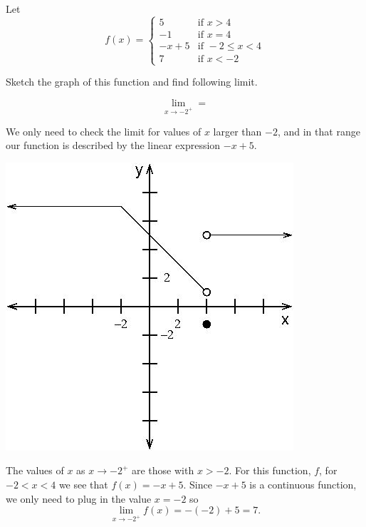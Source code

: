 \documentclass{ximera}
\author{Emma Smith Zbarsky}
\begin{document}
\begin{exercise}

Let
\[f(x) = \begin{cases} 5 & \mbox{if } x>4 \\ -1 & \mbox{if } x=4 \\ -x+5 & \mbox{if } -2\leq x < 4 \\ 7 & \mbox{if } x<-2 \end{cases}\]

Sketch the graph of this function and find following limit.

\[\lim_{x \to -2^+} = \]


\begin{hint}
We only need to check the limit for values of $x$ larger than $-2$, and
in that range our function is described by the linear expression $-x+5$.
\end{hint}


\begin{hint}
\begin{image}\includegraphics[width=.5\textwidth]{piecewise.jpg}\end{image}

 The values of $x$ as $x \to -2^{+}$ are those with
$x>-2$. For this function, $f$, for $-2 < x < 4$ we see that
$f(x) = -x+5$. Since $-x+5$ is a continuous function, we only need to
plug in the value $x=-2$ so \[\lim_{x\to-2^{+}}f(x) = -(-2)+5 = 7.\]
\end{hint}


\begin{multipleChoice}
\end{multipleChoice}

\end{exercise}
\end{document}
